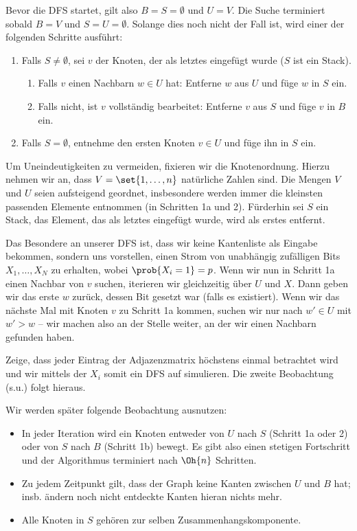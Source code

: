 Bevor die DFS startet, gilt also $B = S = \emptyset$ und $U = V$.
Die Suche terminiert sobald $B = V$ und $S = U = \emptyset$.
Solange dies noch nicht der Fall ist, wird einer der folgenden Schritte ausführt:

\begin{enumerate}
    \item Falls $S \ne \emptyset$, sei $v$ der Knoten, der als letztes eingefügt wurde ($S$ ist ein Stack).
          \begin{enumerate}
              \item Falls $v$ einen Nachbarn $w \in U$ hat: Entferne $w$ aus $U$ und füge $w$ in $S$ ein.
              \item Falls nicht, ist $v$ vollständig bearbeitet: Entferne $v$ aus $S$ und füge $v$ in $B$ ein.
          \end{enumerate}
    \item Falls $S = \emptyset$, entnehme den ersten Knoten $v \in U$ und füge ihn in $S$ ein.
\end{enumerate}

Um Uneindeutigkeiten zu vermeiden, fixieren wir die Knotenordnung.
Hierzu nehmen wir \oBdA an, dass $V = \set{1, \ldots, n}$ natürliche Zahlen sind.
Die Mengen $V$ und $U$ seien aufsteigend geordnet, insbesondere werden immer die kleinsten passenden Elemente entnommen (in Schritten 1a und 2).
Fürderhin sei $S$ ein Stack, \dh das Element, das als letztes eingefügt wurde, wird als erstes entfernt.

Das Besondere an unserer DFS ist, dass wir keine Kantenliste als Eingabe bekommen, sondern uns vorstellen, einen Strom von unabhängig zufälligen Bits $X_1, \ldots, X_N$ zu erhalten, wobei $\prob{X_i = 1} = p$.
Wenn wir nun in Schritt 1a einen Nachbar von $v$ suchen, iterieren wir gleichzeitig über $U$ und $X$.
Dann geben wir das erste $w$ zurück, dessen Bit gesetzt war (falls es existiert).
Wenn wir das nächste Mal mit Knoten $v$ zu Schritt 1a kommen, suchen wir nur nach $w' \in U$ mit $w' > w$ -- wir machen also an der Stelle weiter, an der wir einen Nachbarn gefunden haben.

\begin{exercise}
    Zeige, dass jeder Eintrag der Adjazenzmatrix höchstens einmal betrachtet wird und wir mittels der $X_i$ somit ein DFS auf \Gnp simulieren.
    Die zweite Beobachtung (s.u.) folgt hieraus.
\end{exercise}

\noindent
Wir werden später folgende Beobachtung ausnutzen:
\begin{itemize}
    \item In jeder Iteration wird ein Knoten entweder von $U$ nach $S$ (Schritt 1a oder 2) oder von $S$ nach $B$ (Schritt 1b) bewegt.
          Es gibt also einen stetigen Fortschritt und der Algorithmus terminiert nach $\Oh{n}$ Schritten.
    \item Zu jedem Zeitpunkt gilt, dass der Graph keine Kanten zwischen $U$ und $B$ hat; insb. ändern noch nicht entdeckte Kanten hieran nichts mehr.
    \item Alle Knoten in $S$ gehören zur selben Zusammenhangskomponente.
\end{itemize}

